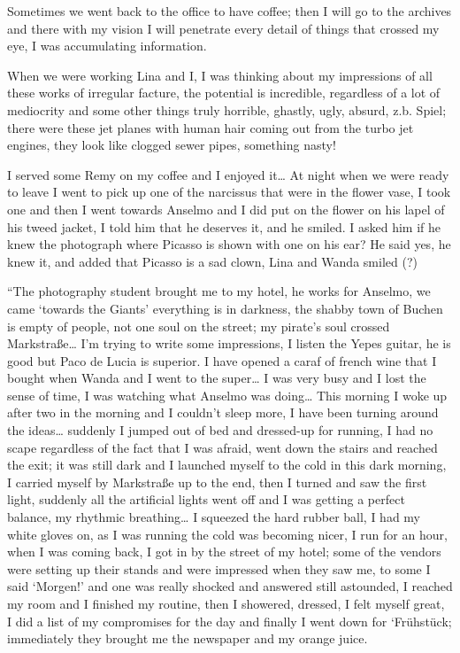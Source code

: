 \documentclass[smalldemyvopaper,11pt,twoside,onecolumn,openright,extrafontsizes]{memoir}
\begin{document}
Sometimes we went back to the office to have coffee; then I will go to the archives and there with my vision I will penetrate every detail of things that crossed my eye, I was accumulating information.

When we were working Lina and I, I was thinking about my impressions of all these works of irregular facture, the potential is incredible, regardless of a lot of mediocrity and some other things truly horrible, ghastly, ugly, absurd, z.b. Spiel; there were these jet planes with human hair coming out from the turbo jet engines, they look like clogged sewer pipes, something nasty! 

I served some Remy on my coffee and I enjoyed it… At night when we were ready to leave I went to pick up one of the narcissus that were in the flower vase, I took one and then I went towards Anselmo and I did put on the flower on his lapel of his tweed jacket, I told him that he deserves it, and he smiled. I asked him if he knew the photograph where Picasso is shown with one on his ear? He said yes, he knew it, and added that Picasso is a sad clown, Lina and Wanda smiled (?)

\ornamentbreak

“The photography student brought me to my hotel, he works for Anselmo, we came ‘towards the Giants’ everything is in darkness, the shabby town of Buchen is empty of people, not one soul on the street; my pirate’s soul crossed Markstraße… I’m trying to write some impressions, I listen the Yepes guitar, he is good but Paco de Lucia is superior. I have opened a caraf of french wine that I bought when Wanda and I went to the super… I was very busy and I lost the sense of time, I was watching what Anselmo was doing… This morning I woke up after two in the morning and I couldn’t sleep more, I have been turning around the ideas… suddenly I jumped out of bed and dressed-up for running, I had no scape regardless of the fact that I was afraid, went down the stairs and reached the exit; it was still dark and I launched myself to the cold in this dark morning, I carried myself by Markstraße up to the end, then I turned and saw the first light, suddenly all the artificial lights went off and I was getting a perfect balance, my rhythmic breathing… I squeezed the hard rubber ball, I had my white gloves on, as I was running the cold was becoming nicer, I run for an hour, when I was coming back, I got in by the street of my hotel; some of the vendors were setting up their stands and were impressed when they saw me, to some I said ‘Morgen!’ and one was really shocked and answered still astounded, I reached my room and I finished my routine, then I showered, dressed, I felt myself great, I did a list of my compromises for the day and finally I went down for ‘Frühstück; immediately they brought me the newspaper and my orange juice.
\end{document}
